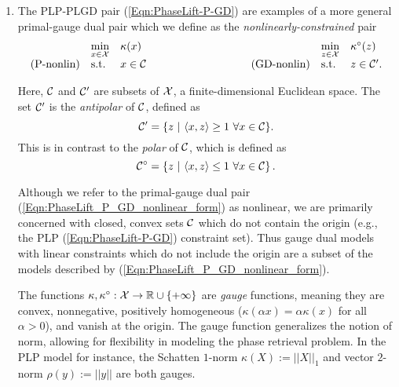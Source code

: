 \begin{enumerate}
\item

The PLP-PLGD pair (\ref{Eqn:PhaseLift-P-GD}) are examples of a more general primal-gauge dual pair which we define as the \textit{nonlinearly-constrained} pair
\begin{equation} 			\label{Eqn:PhaseLift_P_GD_nonlinear_form}
\begin{array}{lllllll}
	&	\min\limits_{\substack{x \in \caX}}
		&	\kappa(x)
			&
				&	\min\limits_{\substack{z \in \caX}}
					&	\kappa^\circ(z)
						\\
\textnormal{(P-nonlin)}
	&	\st
		& 	x \in \caC
			&	\hspace{3cm} 	\textnormal{(GD-nonlin)}
				&	\st
					&	z \in \caC'.
\end{array}
\end{equation}

Here, ${\mathcal C}$ and ${\mathcal C}'$ are subsets of ${\mathcal X}$, a finite-dimensional Euclidean space.  The set ${\mathcal C}'$ is the \textit{antipolar} of ${\mathcal C}$, defined as
\begin{equation}  			\label{Def:antipolar_set}
{\mathcal C}' = \{ z \ | \ \langle x, z \rangle \geq 1 \ \forall x \in {\mathcal C} \}.
\end{equation}
This is in contrast to the \textit{polar} of ${\mathcal C}$, which is defined as
\begin{equation} 			\label{Def:polar}
{\mathcal C}^\circ = \left\{ z \ | \ \langle x, z \rangle \leq 1 \ \forall x \in {\mathcal C} \right\}.
\end{equation}

Although we refer to the primal-gauge dual pair (\ref{Eqn:PhaseLift_P_GD_nonlinear_form}) as nonlinear, we are primarily concerned with closed, convex sets ${\mathcal C}$ which do not contain the origin (e.g., the PLP (\ref{Eqn:PhaseLift-P-GD}) constraint set).  Thus gauge dual models with linear constraints which do not include the origin are a subset of the models described by (\ref{Eqn:PhaseLift_P_GD_nonlinear_form}).

The functions $\kappa, \kappa^\circ : {\mathcal X} \rightarrow {\mathbb R} \cup \{+\infty\}$ are \textit{gauge} functions, meaning they are convex, nonnegative, positively homogeneous ($\kappa(\alpha x) = \alpha \kappa(x)$ for all $\alpha > 0$), and vanish at the origin.  The gauge function generalizes the notion of norm, allowing for flexibility in modeling the phase retrieval problem.  In the PLP model for instance, the Schatten $1$-norm $\kappa(X) := || X ||_1$ and  vector $2$-norm $\rho(y) := ||y||$ are both gauges.


\end{enumerate}
